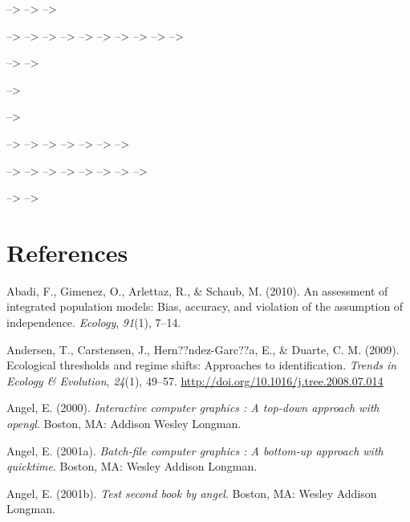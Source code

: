 \documentclass[12pt,twoside,openany]{reedthesis}
\begin{document}
--\textgreater{} --\textgreater{} --\textgreater{}

--\textgreater{} --\textgreater{} --\textgreater{} --\textgreater{}
--\textgreater{} --\textgreater{} --\textgreater{} --\textgreater{}
--\textgreater{} --\textgreater{}

--\textgreater{} --\textgreater{}

--\textgreater{}

--\textgreater{}

--\textgreater{} --\textgreater{} --\textgreater{} --\textgreater{}
--\textgreater{} --\textgreater{} --\textgreater{}

--\textgreater{} --\textgreater{} --\textgreater{} --\textgreater{}
--\textgreater{} --\textgreater{} --\textgreater{} --\textgreater{}

--\textgreater{} --\textgreater{}

\backmatter

\chapter*{References}\label{references}


\noindent

\setlength{\parindent}{-0.20in} \setlength{\leftskip}{0.20in}
\setlength{\parskip}{8pt}

\hypertarget{refs}{}
\hypertarget{ref-abadi2010assessment}{}
Abadi, F., Gimenez, O., Arlettaz, R., \& Schaub, M. (2010). An
assessment of integrated population models: Bias, accuracy, and
violation of the assumption of independence. \emph{Ecology},
\emph{91}(1), 7--14.

\hypertarget{ref-andersen_ecological_2009}{}
Andersen, T., Carstensen, J., Hern??ndez-Garc??a, E., \& Duarte, C. M.
(2009). Ecological thresholds and regime shifts: Approaches to
identification. \emph{Trends in Ecology \& Evolution}, \emph{24}(1),
49--57. \url{http://doi.org/10.1016/j.tree.2008.07.014}

\hypertarget{ref-angel2000}{}
Angel, E. (2000). \emph{Interactive computer graphics : A top-down
approach with opengl}. Boston, MA: Addison Wesley Longman.

\hypertarget{ref-angel2001}{}
Angel, E. (2001a). \emph{Batch-file computer graphics : A bottom-up
approach with quicktime}. Boston, MA: Wesley Addison Longman.

\hypertarget{ref-angel2002a}{}
Angel, E. (2001b). \emph{Test second book by angel}. Boston, MA: Wesley
Addison Longman.
\end{document}
